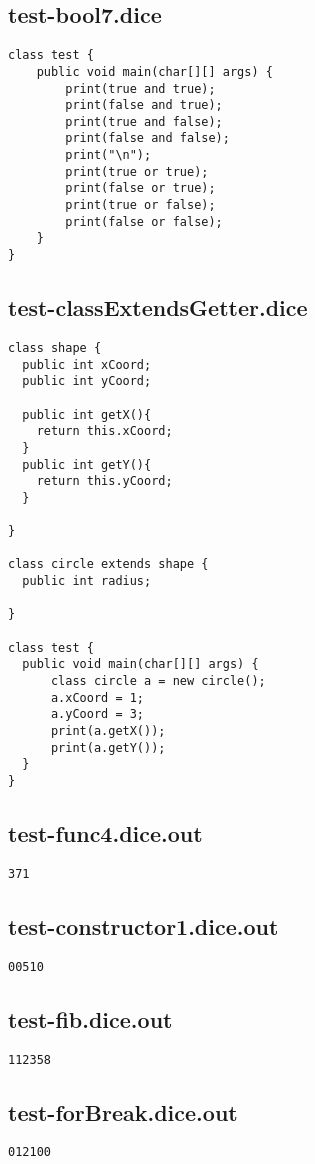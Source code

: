 \subsection{test-bool7.dice}
\begin{verbatim}
class test {
	public void main(char[][] args) {
		print(true and true);
		print(false and true);
		print(true and false);
		print(false and false);
		print("\n");
		print(true or true);
		print(false or true);
		print(true or false);
		print(false or false);
	}
}
\end{verbatim}
\pagebreak
\subsection{test-classExtendsGetter.dice}
\begin{verbatim}
class shape {
  public int xCoord;
  public int yCoord;

  public int getX(){
  	return this.xCoord;
  }
  public int getY(){
   	return this.yCoord;
  }

}

class circle extends shape {
  public int radius;

}

class test {
  public void main(char[][] args) {
      class circle a = new circle(); 
      a.xCoord = 1;
      a.yCoord = 3;
      print(a.getX());
      print(a.getY());
  }
}
\end{verbatim}
\pagebreak
\subsection{test-func4.dice.out}
\begin{verbatim}
371
\end{verbatim}
\pagebreak
\subsection{test-constructor1.dice.out}
\begin{verbatim}
00510
\end{verbatim}
\pagebreak
\subsection{test-fib.dice.out}
\begin{verbatim}
112358
\end{verbatim}
\pagebreak
\subsection{test-forBreak.dice.out}
\begin{verbatim}
012100
\end{verbatim}
\pagebreak

